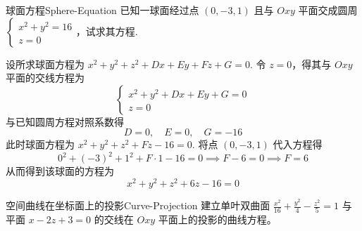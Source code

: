 \begin{problem}{球面方程}{Sphere-Equation}
    已知一球面经过点 $(0, -3, 1)$ 且与 $Oxy$ 平面交成圆周 $\begin{cases} x^2 + y^2 = 16 \\ z = 0 \end{cases}$，试求其方程.
\end{problem}

\begin{solution}
    设所求球面方程为 $x^2 + y^2 + z^2 + Dx + Ey + Fz + G = 0$. 令 $z = 0$，得其与 $Oxy$ 平面的交线方程为
    \begin{equation}
        \begin{cases}
            x^2 + y^2 + Dx + Ey + G = 0 \\
            z = 0
        \end{cases}
    \end{equation}
    与已知圆周方程对照系数得
    \begin{equation}
        D = 0, \quad E = 0, \quad G = -16
    \end{equation}
    此时球面方程为 $x^2 + y^2 + z^2 + Fz - 16 = 0$. 将点 $(0, -3, 1)$ 代入方程得
    \begin{equation}
        0^2 + (-3)^2 + 1^2 + F \cdot 1 - 16 = 0 \implies F - 6 = 0 \implies F = 6
    \end{equation}
    从而得到该球面的方程为
    \begin{equation}
        \boxed{x^2 + y^2 + z^2 + 6z - 16 = 0}
    \end{equation}
\end{solution}


\begin{problem}{空间曲线在坐标面上的投影}{Curve-Projection}
    建立单叶双曲面 $\frac{x^2}{16} + \frac{y^2}{4} - \frac{z^2}{5} = 1$ 与平面 $x - 2z + 3 = 0$ 的交线在 $Oxy$ 平面上的投影的曲线方程。
\end{problem}


